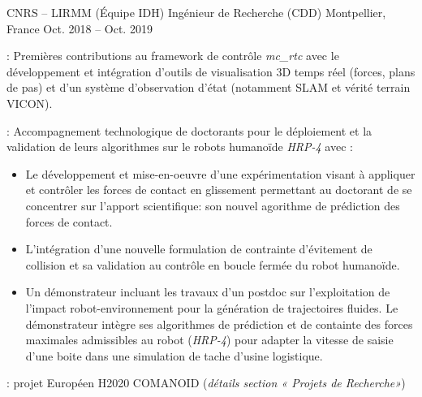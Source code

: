 \begin{cventries}
  \cventry
  {CNRS -- LIRMM (Équipe IDH)} %
  {Ingénieur de Recherche (CDD)} %
  {Montpellier, France} %
  {Oct. 2018 -- Oct. 2019} %
  {
    \begin{cvitems} %
    \item {} : Premières contributions au framework de contrôle
      \emph{mc\_rtc} avec le développement et intégration d'outils de visualisation 3D temps réel (forces,
      plans de pas) et d'un système d'observation d'état (notamment SLAM et vérité terrain VICON).
    \item {} : Accompagnement technologique de doctorants pour
      le déploiement et la validation de leurs algorithmes sur le robots humanoïde \emph{HRP-4} avec :
      \begin{itemize}
        \item Le développement et mise-en-oeuvre d'une expérimentation visant à appliquer et contrôler les
          forces de contact en glissement permettant au doctorant de se concentrer sur l'apport scientifique:
          son nouvel agorithme de prédiction des forces de contact.
        \item L'intégration d'une nouvelle formulation de contrainte d'évitement de collision et sa
          validation au contrôle en boucle fermée du robot humanoïde.
        \item Un démonstrateur incluant les travaux d'un postdoc sur l'exploitation de l'impact
          robot-environnement pour la génération de trajectoires fluides. Le démonstrateur intègre ses
          algorithmes de prédiction et de containte des forces maximales admissibles au robot (\emph{HRP-4})
          pour adapter la vitesse de saisie d'une boite dans une simulation de tache d'usine logistique.
      \end{itemize}
    \item {} : projet Européen H2020 COMANOID (\emph{détails
      section « Projets de Recherche»})
    \end{cvitems}
  }


\end{cventries}
